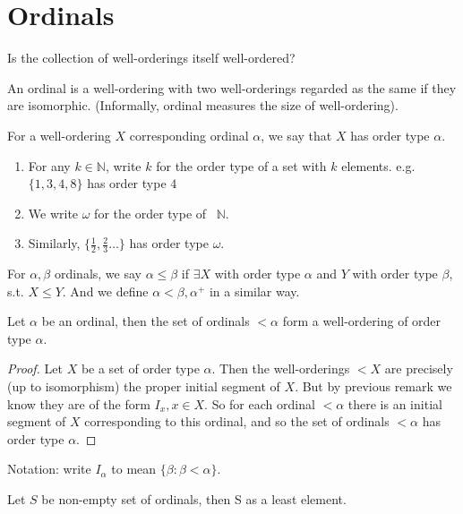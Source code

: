 \section{Ordinals}
Is the collection of well-orderings itself well-ordered?
\begin{definition} An ordinal is a well-ordering with two well-orderings
regarded as the same if they are isomorphic. (Informally, ordinal measures
the size of well-ordering).
\end{definition}
\begin{definition} For a well-ordering $X$ corresponding ordinal $\alpha$,
we say that $X$ has order type $\alpha$.
\end{definition}
\begin{example}
\begin{enumerate}
\item For any $k \in \mathbb{N}$, write $k$ for the order type of a set with $k$ elements. e.g.$\{1,3,4,8\}$ has order type $4$\\
\item We write $\omega$ for the order type of ~$\mathbb{N}$.\\
\item Similarly, $\{\frac{1}{2}, \frac{2}{3} \ldots\}$ has order type $\omega$.
\end{enumerate}
\end{example}
\begin{definition} For $\alpha, \beta$ ordinals, we say $\alpha \le \beta$
if $\exists X$ with order type $\alpha$ and $Y$ with order type $\beta$,
s.t. $X \le Y$. And we define $\alpha < \beta, \alpha ^+$ in a similar way.
\end{definition}
\begin{proposition} Let $\alpha$ be an ordinal, then the set of ordinals
$< \alpha$ form a well-ordering of order type $\alpha$.
\end{proposition}
\begin{proof} Let $X$ be a set of order type $\alpha$. Then the
well-orderings $<X$ are precisely (up to isomorphism) the proper
initial segment of $X$. But by previous remark we know they are of
the form $I_x, x \in X$. So for each ordinal $< \alpha$ there is an
initial segment of $X$ corresponding to this ordinal, and so the set
of ordinals $< \alpha$ has order type $\alpha$.
\end{proof}
Notation: write $I_{\alpha}$ to mean $\{\beta: \beta < \alpha\}$.
\begin{proposition} Let $S$ be non-empty set of ordinals, then S as a least element.
\end{proposition}
